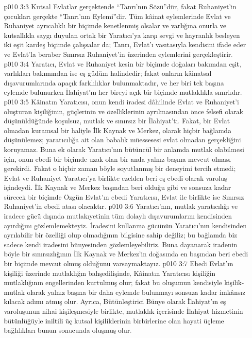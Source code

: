 \vs p010 3:3 Kutsal Evlatlar gerçektende “Tanrı’nın Sözü”dür, fakat Ruhaniyet’in çocukları gerçekte “Tanrı’nın Eylemi”dir. Tüm kâinat eylemlerinde Evlat ve Ruhaniyet ayrıcalıklı bir biçimde kenetlenmiş olsalar ve varlığına onurla ve kutsallıkla saygı duyulan ortak bir Yaratıcı’ya karşı sevgi ve hayranlık besleyen iki eşit kardeş biçimde çalışsalar da; Tanrı, Evlat’ı vasıtasıyla kendisini ifade eder ve Evlat’la beraber Sınırsız Ruhaniyet’in üzerinden eylemlerini gerçekleştirir.
\vs p010 3:4 Yaratıcı, Evlat ve Ruhaniyet kesin bir biçimde doğaları bakımdan eşit, varlıkları bakımından ise eş güdüm halindedir; fakat onların kâinatsal dışavurumlarında apaçık farklılıklar bulunmaktadır, ve her biri tek başına eylemde bulunurken İlahiyat’ın her bireyi açık bir biçimde mutlaklıkla sınırlıdır.
\vs p010 3:5 Kâinatın Yaratıcısı, onun kendi iradesi dâhilinde Evlat ve Ruhaniyet’i oluşturan kişiliğinin, güçlerinin ve özelliklerinin ayrılmasından önce felsefi olarak düşünüldüğünde koşulsuz, mutlak ve sınırsız bir İlahiyat’tı. Fakat, bir Evlat olmadan kuramsal bir haliyle İlk Kaynak ve Merkez,  olarak hiçbir bağlamda düşünülemez; yaratıcılığa ait olan babalık müessesesi evlat olmadan gerçekliğini koruyamaz. Buna ek olarak Yaratıcı’nın bütüncül bir anlamda mutlak olabilmesi için, onun ebedi bir biçimde uzak olan bir anda yalnız başına mevcut olması gerekirdi. Fakat o hiçbir zaman böyle soyutlanmış bir deneyimi tercih etmedi; Evlat ve Ruhaniyet Yaratıcı’ya birlikte ezelden beri eş ebedi olarak varoluş içindeydi. İlk Kaynak ve Merkez başından beri olduğu gibi ve sonsuza kadar sürecek bir biçimde Özgün Evlat’ın ebedi Yaratıcısı, Evlat ile birlikte ise Sınırsız Ruhaniyet’in ebedi atası olacaktır.
\vs p010 3:6 Yaratıcı’nın, mutlak yaratıcılığı ve iradece gücü dışında mutlakıyetinin tüm dolaylı dışavurumlarını kendisinden ayırdığını gözlemlemekteyiz. İradesini kullanma gücünün Yaratıcı’nın kendisinden ayrılabilir bir özelliği olup olmadığının bilgisine sahip değiliz; bu bağlamda biz sadece kendi iradesini bünyesinden  gözlemleyebiliriz. Buna dayanarak iradenin böyle bir sınırsızlığının İlk Kaynak ve Merkez’in doğasında en başından beri ebedi bir biçimde mevcut olmuş olduğunu varsaymaktayız.
\vs p010 3:7 Ebedi Evlat’ın kişiliği üzerinde mutlaklığın bahşedilişinde, Kâinatın Yaratıcısı kişiliğin mutlaklığının engellerinden kurtulmuş olur; fakat bu oluşumun kendisiyle kişilik\hyp{}mutlak olarak yalnız başına bir daha eylemde bulunmayı sonsuza kadar imkânsız kılacak adımı atmış olur. Ayrıca, Bütünleştirici Bünye olarak İlahiyat’ın eş varoluşunun nihai kişileşmesiyle birlikte, mutlaklık içerisinde İlahiyat hizmetinin bütünlüğüyle iniltili üç kutsal kişiliklerinin birbirlerine olan hayati üçleme bağlılıkları bunun sonucunda oluşmuş olur.
